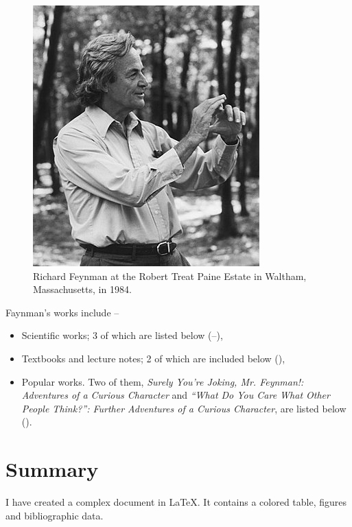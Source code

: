\documentclass[12pt]{article}
\begin{document}
\begin{figure}[h!]
\includegraphics[scale=0.3]{Richard F.jpg}
\caption{ Richard Feynman at the Robert Treat Paine Estate in Waltham, Massachusetts, in 1984. }
\label{fig:Feynman}
\end{figure}

Faynman's works include --

\begin{itemize}
\item Scientific works; 3 of which are listed below (\cite{Feynman:48a}--\cite{Feynman:48c}),
\item Textbooks and lecture notes; 2 of which are included below (\cite{Feynman:61,Feynman:62}),
\item Popular works. Two of them, {\em Surely You're Joking, Mr. Feynman!: Adventures of a Curious Character} and {\em ``What Do You Care What Other People Think?'': Further Adventures of a Curious Character},  are listed below (\cite{Feynman:85,Feynman:88}).
\end{itemize}



\section{Summary}

I have created a complex document in \LaTeX. It contains a colored table, figures and bibliographic data.\\

\\
\end{document}
